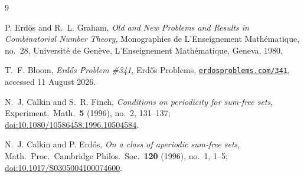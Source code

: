 \documentclass[11pt,letterpaper]{article}
\begin{document}
\begin{thebibliography}{9}

P. Erd\H{o}s and R.~L. Graham, \emph{Old and New Problems and Results in Combinatorial Number Theory}, Monographies de L'Enseignement Math\'ematique, no.~28, Universit\'e de Gen\`eve, L'Enseignement Math\'ematique, Geneva, 1980.

T.~F. Bloom, \emph{Erd\H{o}s Problem \#341}, Erd\H{o}s Problems, \href{https://www.erdosproblems.com/341}{\texttt{erdosproblems.com/341}}, accessed 11 August 2026.

N.~J. Calkin and S.~R. Finch, \emph{Conditions on periodicity for sum-free sets}, Experiment.\ Math.\ \textbf{5} (1996), no.~2, 131--137; \href{https://doi.org/10.1080/10586458.1996.10504584}{doi:10.1080/10586458.1996.10504584}.

N.~J. Calkin and P. Erd\H{o}s, \emph{On a class of aperiodic sum-free sets}, Math.\ Proc.\ Cambridge Philos.\ Soc.\ \textbf{120} (1996), no.~1, 1--5; \href{https://doi.org/10.1017/S0305004100074600}{doi:10.1017/S0305004100074600}.

\end{thebibliography}
\end{document}
